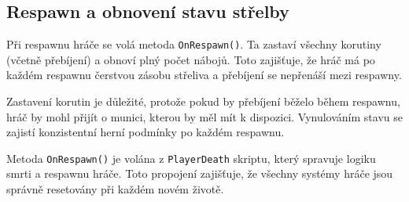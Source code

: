 \subsection{Respawn a obnovení stavu střelby}

Při respawnu hráče se volá metoda \texttt{OnRespawn()}. Ta zastaví všechny korutiny (včetně přebíjení) a obnoví plný počet nábojů. Toto zajišťuje, že hráč má po každém respawnu čerstvou zásobu střeliva a přebíjení se nepřenáší mezi respawny.

Zastavení korutin je důležité, protože pokud by přebíjení běželo během respawnu, hráč by mohl přijít o munici, kterou by měl mít k dispozici. Vynulováním stavu se zajistí konzistentní herní podmínky po každém respawnu.

Metoda \texttt{OnRespawn()} je volána z \texttt{PlayerDeath} skriptu, který spravuje logiku smrti a respawnu hráče. Toto propojení zajišťuje, že všechny systémy hráče jsou správně resetovány při každém novém životě.